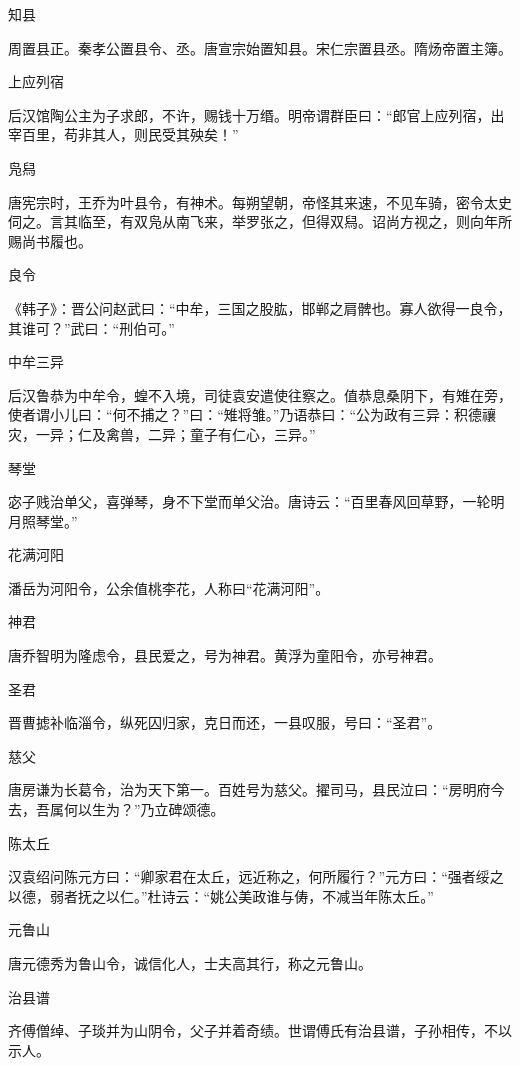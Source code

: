 \documentclass[a4paper,12pt,UTF8,twoside]{ctexbook}
\begin{document}
    知县
    
    周置县正。秦孝公置县令、丞。唐宣宗始置知县。宋仁宗置县丞。隋炀帝置主簿。
    
    上应列宿
    
    后汉馆陶公主为子求郎，不许，赐钱十万缗。明帝谓群臣曰：“郎官上应列宿，出宰百里，苟非其人，则民受其殃矣！”
    
    凫舄
    
    唐宪宗时，王乔为叶县令，有神术。每朔望朝，帝怪其来速，不见车骑，密令太史伺之。言其临至，有双凫从南飞来，举罗张之，但得双舄。诏尚方视之，则向年所赐尚书履也。
    
    良令
    
    《韩子》：晋公问赵武曰：“中牟，三国之股肱，邯郸之肩髀也。寡人欲得一良令，其谁可？”武曰：“刑伯可。”
    
    中牟三异
    
    后汉鲁恭为中牟令，蝗不入境，司徒袁安遣使往察之。值恭息桑阴下，有雉在旁，使者谓小儿曰：“何不捕之？”曰：“雉将雏。”乃语恭曰：“公为政有三异：积德禳灾，一异；仁及禽兽，二异；童子有仁心，三异。”
    
    琴堂
    
    宓子贱治单父，喜弹琴，身不下堂而单父治。唐诗云：“百里春风回草野，一轮明月照琴堂。”
    
    花满河阳
    
    潘岳为河阳令，公余值桃李花，人称曰“花满河阳”。
    
    神君
    
    唐乔智明为隆虑令，县民爱之，号为神君。黄浮为童阳令，亦号神君。
    
    圣君
    
    晋曹摅补临淄令，纵死囚归家，克日而还，一县叹服，号曰：“圣君”。
    
    慈父
    
    唐房谦为长葛令，治为天下第一。百姓号为慈父。擢司马，县民泣曰：“房明府今去，吾属何以生为？”乃立碑颂德。
    
    陈太丘
    
    汉袁绍问陈元方曰：“卿家君在太丘，远近称之，何所履行？”元方曰：“强者绥之以德，弱者抚之以仁。”杜诗云：“姚公美政谁与俦，不减当年陈太丘。”
    
    元鲁山
    
    唐元德秀为鲁山令，诚信化人，士夫高其行，称之元鲁山。
    
    治县谱
    
    齐傅僧绰、子琰并为山阴令，父子并着奇绩。世谓傅氏有治县谱，子孙相传，不以示人。
    
\end{document}
